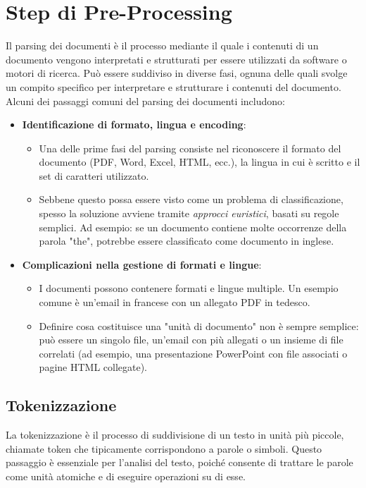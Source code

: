 \documentclass{report}
\begin{document}
	\section{Step di Pre-Processing}
	Il parsing dei documenti è il processo mediante il quale i contenuti di un documento vengono interpretati e strutturati per essere utilizzati da software o motori di ricerca. Può essere suddiviso in diverse fasi, ognuna delle quali svolge un compito specifico per interpretare e strutturare i contenuti del documento. Alcuni dei passaggi comuni del parsing dei documenti includono:
	\begin{itemize}		
		\item \textbf{Identificazione di formato, lingua e encoding}: 
		\begin{itemize}
			\item Una delle prime fasi del parsing consiste nel riconoscere il formato del documento (PDF, Word, Excel, HTML, ecc.), la lingua in cui è scritto e il set di caratteri utilizzato.
			\item Sebbene questo possa essere visto come un problema di classificazione, spesso la soluzione avviene tramite \textit{approcci euristici}, basati su regole semplici. Ad esempio: se un documento contiene molte occorrenze della parola "the", potrebbe essere classificato come documento in inglese.
		\end{itemize}
		\item \textbf{Complicazioni nella gestione di formati e lingue}:
		\begin{itemize}
			\item I documenti possono contenere formati e lingue multiple. Un esempio comune è un'email in francese con un allegato PDF in tedesco.
			\item Definire cosa costituisce una "unità di documento" non è sempre semplice: può essere un singolo file, un'email con più allegati o un insieme di file correlati (ad esempio, una presentazione PowerPoint con file associati o pagine HTML collegate).
		\end{itemize}
	\end{itemize}
	
	\subsection{Tokenizzazione}
	La tokenizzazione è il processo di suddivisione di un testo in unità più piccole, chiamate token che tipicamente corrispondono a parole o simboli. Questo passaggio è essenziale per l'analisi del testo, poiché consente di trattare le parole come unità atomiche e di eseguire operazioni su di esse. 
\end{document}
